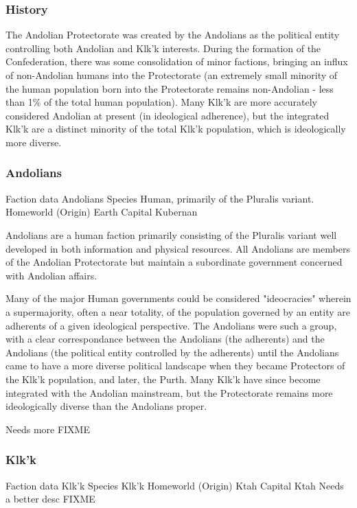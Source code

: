 \subsubsection{History}

The Andolian Protectorate was created by the Andolians as the
political entity controlling both Andolian and Klk'k interests. During
the formation of the Confederation, there was some consolidation of
minor factions, bringing an influx of non-Andolian humans into the
Protectorate (an extremely small minority of the human population born
into the Protectorate remains non-Andolian - less than 1\% of the total
human population). Many Klk'k are more accurately considered Andolian
at present (in ideological adherence), but the integrated Klk'k are a
distinct minority of the total Klk'k population, which is
ideologically more diverse.


\subsubsection{Andolians}

Faction data 
Andolians 
Species 	Human, primarily of the Pluralis variant. 
Homeworld (Origin) 	Earth 
Capital 	Kubernan 

Andolians are a human faction primarily consisting of the Pluralis
variant well developed in both information and physical resources. All
Andolians are members of the Andolian Protectorate but maintain a
subordinate government concerned with Andolian affairs.

Many of the major Human governments could be considered "ideocracies"
wherein a supermajority, often a near totality, of the population
governed by an entity are adherents of a given ideological
perspective. The Andolians were such a group, with a clear
correspondance between the Andolians (the adherents) and the Andolians
(the political entity controlled by the adherents) until the Andolians
came to have a more diverse political landscape when they became
Protectors of the Klk'k population, and later, the Purth. Many Klk'k
have since become integrated with the Andolian mainstream, but the
Protectorate remains more ideologically diverse than the Andolians
proper.

Needs more FIXME 

\subsubsection{Klk'k}

Faction data 
Klk'k 
Species 	Klk'k 
Homeworld (Origin) 	Ktah 
Capital 	Ktah 
Needs a better desc FIXME 

